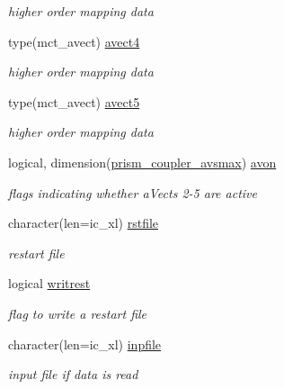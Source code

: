 \begin{DoxyCompactItemize}
\begin{DoxyCompactList}\small\item\em higher order mapping data \end{DoxyCompactList}\item 
type(mct\+\_\+avect) \hyperlink{structmod__oasis__coupler_1_1prism__coupler__type_a478dda1acb9e270efda23a7275b21b83}{avect4}
\begin{DoxyCompactList}\small\item\em higher order mapping data \end{DoxyCompactList}\item 
type(mct\+\_\+avect) \hyperlink{structmod__oasis__coupler_1_1prism__coupler__type_a939d1987d5c66c2352ff40709f255980}{avect5}
\begin{DoxyCompactList}\small\item\em higher order mapping data \end{DoxyCompactList}\item 
logical, dimension(\hyperlink{namespacemod__oasis__coupler_a6f166f099a134dffba97a168d28a3c01}{prism\+\_\+coupler\+\_\+avsmax}) \hyperlink{structmod__oasis__coupler_1_1prism__coupler__type_aa2090cc6941c0dbbbf4bdb5c68cff873}{avon}
\begin{DoxyCompactList}\small\item\em flags indicating whether a\+Vects 2-\/5 are active \end{DoxyCompactList}\item 
character(len=ic\+\_\+xl) \hyperlink{structmod__oasis__coupler_1_1prism__coupler__type_a8a660e192210d1e8ff71f7dded631dce}{rstfile}
\begin{DoxyCompactList}\small\item\em restart file \end{DoxyCompactList}\item 
logical \hyperlink{structmod__oasis__coupler_1_1prism__coupler__type_ac6ed82fd00e0244b23fa874d62a83c9d}{writrest}
\begin{DoxyCompactList}\small\item\em flag to write a restart file \end{DoxyCompactList}\item 
character(len=ic\+\_\+xl) \hyperlink{structmod__oasis__coupler_1_1prism__coupler__type_a0ecb3c23d7b761aa9bfad0fbb59e40d3}{inpfile}
\begin{DoxyCompactList}\small\item\em input file if data is read \end{DoxyCompactList}\item 

\end{DoxyCompactItemize}
